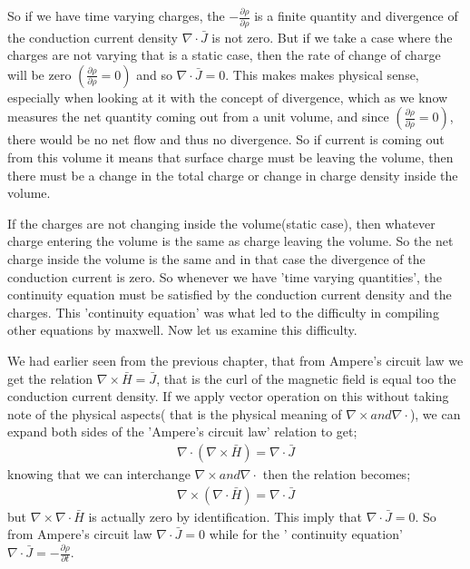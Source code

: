   
  So if we have time varying charges, the $-\frac{\partial\rho}{\partial\rho}$ is a finite quantity and divergence of the conduction current density $\nabla\cdot\bar{J}$ is not zero. But if we take a case where the charges are not varying that is a static case, then the rate of change of charge will be zero $(\frac{\partial\rho}{\partial\rho}=0)$ and so $\nabla\cdot\bar{J}=0$. This makes makes physical sense, especially when looking at it with the concept of divergence, which as we know measures the net quantity coming out from a unit volume, and since $(\frac{\partial\rho}{\partial\rho}=0)$, there would be no net flow and thus no divergence. So if current is coming out from this volume it means that surface charge must be leaving the volume, then there must be a change in the total charge or change in charge density inside the volume.
  
  
  If the charges are not changing inside the volume(static case), then whatever charge entering the volume is the same as charge leaving the volume. So the net charge inside the volume is the same and in that case the divergence of the conduction current is zero. So whenever we have 'time varying quantities', the continuity equation must be satisfied by the conduction current density and the charges. This 'continuity equation' was what led to the difficulty in compiling other equations by maxwell. Now let us examine this difficulty.
  
  
  We had earlier seen from the previous chapter, that from Ampere's circuit law we get the relation $\nabla\times\bar{H}=\bar{J}$, that is the curl of the magnetic field is equal too the conduction current density. If we apply vector operation on this without taking note of the physical aspects( that is the physical meaning of $\nabla\times and  \nabla\cdot$), we can expand both sides of the 'Ampere's circuit law' relation to get;
  \begin{align}
  \nabla\cdot(\nabla\times\bar{H})=\nabla\cdot\bar{J}
  \end{align}
  knowing that we can interchange $\nabla\times and  \nabla\cdot$ then the relation becomes;
  \begin{align}
  \nabla\times(\nabla\cdot\bar{H})=\nabla\cdot\bar{J}
  \end{align}
  but $\nabla\times\nabla\cdot\bar{H}$ is actually zero by identification. This imply that $\nabla\cdot\bar{J}=0$. So from Ampere's circuit law $\nabla\cdot\bar{J}=0$ while for the ' continuity equation'  $\nabla\cdot\bar{J}=-\frac{\partial\rho}{\partial t}$.
  
